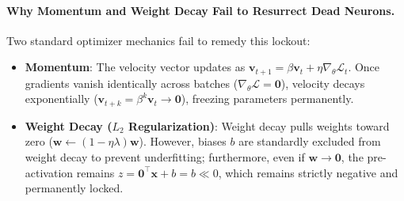 \paragraph{Why Momentum and Weight Decay Fail to Resurrect Dead Neurons.}
Two standard optimizer mechanics fail to remedy this lockout:
\begin{itemize}[noitemsep]
  \item \textbf{Momentum}: The velocity vector updates as $\mathbf{v}_{t+1} = \beta \mathbf{v}_t + \eta \nabla_\theta \mathcal{L}_t$. Once gradients vanish identically across batches ($\nabla_\theta \mathcal{L} = \mathbf{0}$), velocity decays exponentially ($\mathbf{v}_{t+k} = \beta^k \mathbf{v}_t \to \mathbf{0}$), freezing parameters permanently.
  \item \textbf{Weight Decay ($L_2$ Regularization)}: Weight decay pulls weights toward zero ($\mathbf{w} \leftarrow (1 - \eta \lambda)\mathbf{w}$). However, biases $b$ are standardly excluded from weight decay to prevent underfitting; furthermore, even if $\mathbf{w} \to \mathbf{0}$, the pre-activation remains $z = \mathbf{0}^\top \mathbf{x} + b = b \ll 0$, which remains strictly negative and permanently locked.
\end{itemize}

